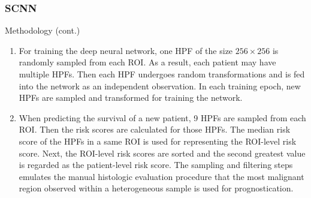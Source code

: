 \documentclass{beamer}
\begin{document}
	\begin{frame}
		\frametitle{SCNN}
		Methodology (cont.)
		\begin{enumerate}[A]
			\item For training the deep neural network, one HPF of the size $256 \times 256$ is randomly sampled from each ROI. As a result, each patient may have multiple HPFs. Then each HPF undergoes random transformations and is fed into the network as an independent observation. In each training epoch, new HPFs are sampled and transformed for training the network.  
			\item When predicting the survival of a new patient, 9 HPFs are sampled from each ROI. Then the risk scores are calculated for those HPFs. The median risk score of the HPFs in a same ROI is used for representing the ROI-level risk score. Next, the ROI-level risk scores are sorted and the second greatest value is regarded as the patient-level risk score. The sampling and filtering steps emulates the manual histologic evaluation procedure that the most malignant region observed within a heterogeneous sample is used for prognostication.
		\end{enumerate}
	\end{frame}

	\begin{frame}[allowframebreaks]
		\begin{singlespace}
			
			
		\end{singlespace}
	\end{frame}
	
\end{document}
